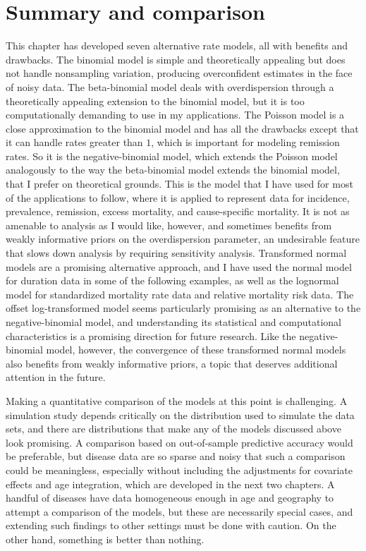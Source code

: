 \section{Summary and comparison}
This chapter has developed seven alternative rate models, all with
benefits and drawbacks.  The binomial model is simple and
theoretically appealing but does not handle nonsampling variation,
producing overconfident estimates in the face of noisy data.  The
beta-binomial model deals with overdispersion through a theoretically
appealing extension to the binomial model, but it is too
computationally demanding to use in my applications.  The Poisson
model is a close approximation to the binomial model and has all
the drawbacks except that it can handle rates greater than $1$, which is
important for modeling remission rates.  So it is the
negative-binomial model, which extends the Poisson model analogously
to the way the beta-binomial model extends the binomial model, that I
prefer on theoretical grounds.  This is the model that I have used for
most of the applications to follow, where it is applied to represent
data for incidence, prevalence, remission, excess mortality, and
cause-specific mortality. It is not as amenable to analysis as I would
like, however, and sometimes benefits from weakly informative priors on
the overdispersion parameter, an undesirable feature that slows down
analysis by requiring sensitivity analysis.  Transformed normal models
are a promising alternative approach, and I have used the normal model
for duration data in some of the following examples, as well as the
lognormal model for standardized mortality rate data and relative
mortality risk data. The offset log-transformed model seems
particularly promising as an alternative to the negative-binomial
model, and understanding its statistical and computational
characteristics is a promising direction for future research.  Like
the negative-binomial model, however, the convergence of these
transformed normal models also benefits from weakly informative priors,
a topic that deserves additional attention in the future.

Making a quantitative comparison of the models at this point is
challenging.  A simulation study depends critically on the
distribution used to simulate the data sets, and there are
distributions that make any of the models discussed above look promising.  A
comparison based on out-of-sample predictive accuracy would be
preferable, but disease data are so sparse and noisy that such a comparison could be
meaningless, especially without including the adjustments for covariate
effects and age integration, which are developed in the next two
chapters.  A handful of diseases have data homogeneous enough in age
and geography to attempt a comparison of the models, but these are necessarily special
cases, and extending such findings to other settings must be done with
caution.  On the other hand, something is better than nothing.


